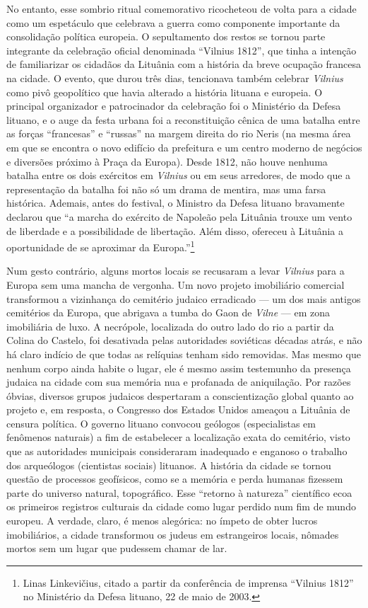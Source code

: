 No entanto, esse sombrio ritual comemorativo ricocheteou de volta para a
cidade como um espetáculo que celebrava a guerra como componente
importante da consolidação política europeia. O sepultamento dos restos
se tornou parte integrante da celebração oficial denominada ``Vilnius
1812'', que tinha a intenção de familiarizar os cidadãos da Lituânia com
a história da breve ocupação francesa na cidade. O evento, que durou
três dias, tencionava também celebrar \textit{Vilnius} como pivô geopolítico que
havia alterado a história lituana e europeia. O principal organizador e
patrocinador da celebração foi o Ministério da Defesa lituano, e o auge
da festa urbana foi a reconstituição cênica de uma batalha entre as
forças ``francesas'' e ``russas'' na margem direita do rio Neris (na
mesma área em que se encontra o novo edifício da prefeitura e um centro
moderno de negócios e diversões próximo à Praça da Europa). Desde 1812,
não houve nenhuma batalha entre os dois exércitos em \textit{Vilnius} ou em seus
arredores, de modo que a representação da batalha foi não só um drama de
mentira, mas uma farsa histórica. Ademais, antes do festival, o Ministro
da Defesa lituano bravamente declarou que ``a marcha do exército de
Napoleão pela Lituânia trouxe um vento de liberdade e a possibilidade de
libertação. Além disso, ofereceu à Lituânia a oportunidade de se
aproximar da Europa.''\footnote{Linas Linkevičius, citado a partir da conferência de imprensa ``Vilnius 1812'' no Ministério da Defesa lituano, 22 de maio de 2003.}

Num gesto contrário, alguns mortos locais se recusaram a levar \textit{Vilnius}
para a Europa sem uma mancha de vergonha. Um novo projeto imobiliário
comercial transformou a vizinhança do cemitério judaico erradicado --- um
dos mais antigos cemitérios da Europa, que abrigava a tumba do Gaon de
\textit{Vilne} --- em zona imobiliária de luxo. A necrópole, localizada do outro
lado do rio a partir da Colina do Castelo, foi desativada pelas
autoridades soviéticas décadas atrás, e não há claro indício de que
todas as relíquias tenham sido removidas. Mas mesmo que nenhum corpo
ainda habite o lugar, ele é mesmo assim testemunho da presença judaica
na cidade com sua memória nua e profanada de aniquilação. Por razões
óbvias, diversos grupos judaicos despertaram a conscientização global
quanto ao projeto e, em resposta, o Congresso dos Estados Unidos ameaçou
a Lituânia de censura política. O governo lituano convocou geólogos
(especialistas em fenômenos naturais) a fim de estabelecer a localização
exata do cemitério, visto que as autoridades municipais consideraram
inadequado e enganoso o trabalho dos arqueólogos (cientistas sociais)
lituanos. A história da cidade se tornou questão de processos
geofísicos, como se a memória e perda humanas fizessem parte do universo
natural, topográfico. Esse ``retorno à natureza'' científico ecoa os
primeiros registros culturais da cidade como lugar perdido num fim de
mundo europeu. A verdade, claro, é menos alegórica: no ímpeto de obter
lucros imobiliários, a cidade transformou os judeus em estrangeiros
locais, nômades mortos sem um lugar que pudessem chamar de lar.

